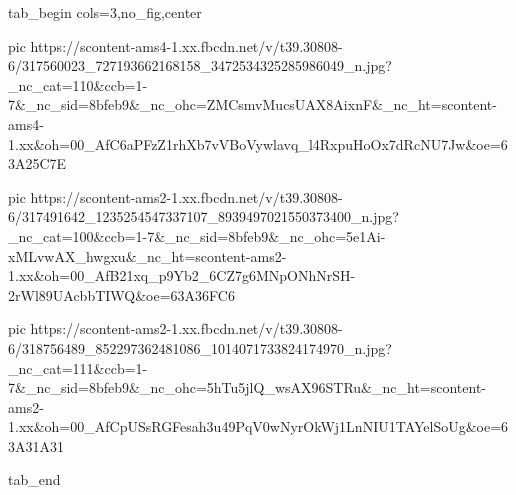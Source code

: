  
 
 
 
 


\ifcmt
  tab_begin cols=3,no_fig,center

     pic https://scontent-ams4-1.xx.fbcdn.net/v/t39.30808-6/317560023_727193662168158_3472534325285986049_n.jpg?_nc_cat=110&ccb=1-7&_nc_sid=8bfeb9&_nc_ohc=ZMCsmvMucsUAX8AixnF&_nc_ht=scontent-ams4-1.xx&oh=00_AfC6aPFzZ1rhXb7vVBoVywlavq_l4RxpuHoOx7dRcNU7Jw&oe=63A25C7E

     pic https://scontent-ams2-1.xx.fbcdn.net/v/t39.30808-6/317491642_1235254547337107_8939497021550373400_n.jpg?_nc_cat=100&ccb=1-7&_nc_sid=8bfeb9&_nc_ohc=5e1Ai-xMLvwAX_hwgxu&_nc_ht=scontent-ams2-1.xx&oh=00_AfB21xq_p9Yb2_6CZ7g6MNpONhNrSH-2rWl89UAcbbTIWQ&oe=63A36FC6

     pic https://scontent-ams2-1.xx.fbcdn.net/v/t39.30808-6/318756489_852297362481086_1014071733824174970_n.jpg?_nc_cat=111&ccb=1-7&_nc_sid=8bfeb9&_nc_ohc=5hTu5jlQ_wsAX96STRu&_nc_ht=scontent-ams2-1.xx&oh=00_AfCpUSsRGFesah3u49PqV0wNyrOkWj1LnNIU1TAYelSoUg&oe=63A31A31

  tab_end
\fi
